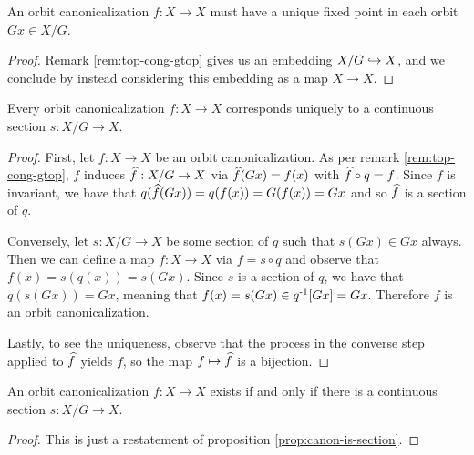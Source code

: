 \begin{remark}
    An orbit canonicalization $f : X \to X$ must have a unique fixed point in each orbit $Gx \in X/G$.
    \begin{proof}
        Remark \ref{rem:top-cong-gtop} gives us an embedding $X/G \ito X$, and we conclude by instead considering this embedding as a map $X \to X$.
    \end{proof}
\end{remark}

\begin{proposition}\label{prop:canon-is-section}
    Every orbit canonicalization $f : X \to X$ corresponds uniquely to a continuous section $s : X/G \to X$.
    \begin{proof}
        First, let $f : X \to X$ be an orbit canonicalization.
        As per remark \ref{rem:top-cong-gtop}, $f$ induces $\Hat{f} : X/G \to X$ via $\Hat{f}(Gx) = f(x)$ with $\Hat{f} \circ q = f$.
        Since $f$ is invariant, we have that $q(\Hat{f}(Gx)) = q(f(x)) = G(f(x)) = Gx$ and so $\Hat{f}$ is a section of $q$.
        
        Conversely, let $s : X/G \to X$ be some section of $q$ such that $s(Gx) \in Gx$ always.
        Then we can define a map $f : X \to X$ via $f = s \circ q$ and observe that $f(x) = s(q(x)) = s(Gx)$.
        Since $s$ is a section of $q$, we have that $q(s(Gx)) = Gx$, meaning that $f(x) = s(Gx) \in \inv{q}[Gx] = Gx$.
        Therefore $f$ is an orbit canonicalization.

        Lastly, to see the uniqueness, observe that the process in the converse step applied to $\Hat{f}$ yields $f$, so the map $f \mapsto \Hat{f}$ is a bijection.
    \end{proof}
\end{proposition}

\begin{corollary}
    An orbit canonicalization $f : X \to X$ exists if and only if there is a continuous section $s : X/G \to X$.
    \begin{proof}
        This is just a restatement of proposition \ref{prop:canon-is-section}.
    \end{proof}
\end{corollary}